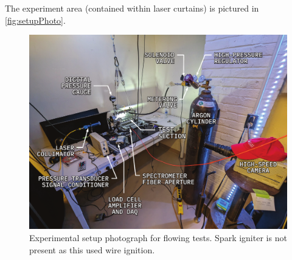                 The experiment area (contained within laser curtains) is pictured in \autoref{fig:setupPhoto}.

                \begin{landscape}
                    \begin{figure}[h]
                        \centering
                        \includegraphics[]{assets/3 design/setupPhoto.pdf}
                        \caption[Experimental setup photograph for flowing tests]{Experimental setup photograph for flowing tests. Spark igniter is not present as this used wire ignition.}
                        \label{fig:setupPhoto}
                    \end{figure}
                \end{landscape}


